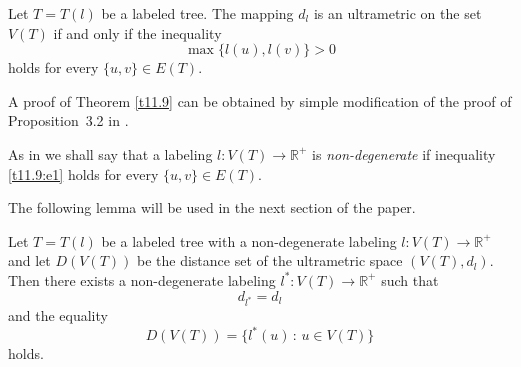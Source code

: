 \documentclass{article}
\begin{document}
\begin{Theorem}\label{t11.9}
Let \(T = T(l)\) be a labeled tree. The mapping \(d_l\) is an ultrametric  on the set $V(T)$ if and only if the inequality
\begin{equation}\label{t11.9:e1}
\max\{l(u), l(v)\} > 0
\end{equation}
holds for every \(\{u, v\} \in E(T)\).
\end{Theorem}

A proof of Theorem \ref{t11.9} can be obtained by simple modification of the proof of Proposition~3.2 in \cite{Dov2020TaAoG}.


As in \cite{DV2025JMS,DR2025USGbLSG} we shall say that a labeling $l \colon V(T) \to \mathbb{R}^+$ is {\it non-degenerate} if  inequality \eqref{t11.9:e1}
holds for every $\{u, v\} \in E(T)$.





The following lemma will be used in the next section of the paper.

\begin{Lemma}\label{lem1}
Let $T=T(l)$ be a labeled tree with a non-degenerate labeling
$l\colon V(T)\to \mathbb{R}^+$ and let $D(V(T))$ be the distance set of the ultrametric space $(V(T),d_l)$.
Then there exists a non-degenerate labeling
$l^*\colon V(T)\to \mathbb{R}^+$ such that
\begin{equation}
    \label{eq0}
d_{l^*}=d_{l}
\end{equation}
and the equality
\begin{equation}
    \label{eq1}
D(V(T))=\{l^*(u)\,:\,u\in V(T)\}
\end{equation}
holds.
\end{Lemma}
\end{document}
